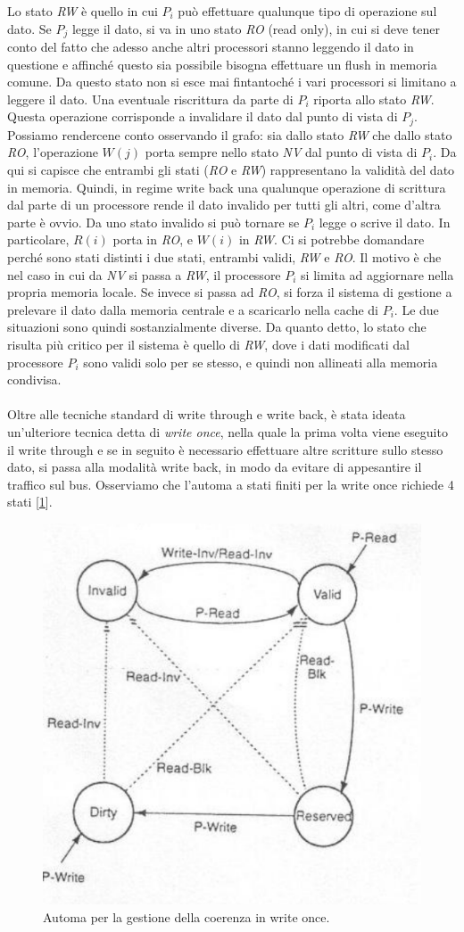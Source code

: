 Lo stato \textit{RW} è quello in cui \(P_i\)
può effettuare qualunque tipo di operazione sul dato. Se \(P_j\) legge il dato, si va in uno stato \textit{RO}
(read only), in cui si deve tener conto del fatto che adesso anche altri processori stanno leggendo il dato in
questione e affinché questo sia possibile bisogna effettuare un flush in memoria comune. Da questo stato non si esce mai fintantoché i vari processori si limitano a leggere il dato.
Una eventuale riscrittura da parte di \(P_i\) riporta allo stato \textit{RW}. Questa operazione corrisponde a
invalidare il dato dal punto di vista di \(P_j\). Possiamo rendercene conto osservando il grafo: sia dallo stato \textit{RW} che dallo stato \textit{RO}, l'operazione \(W(j)\) porta sempre nello stato
\textit{NV} dal punto di vista di \(P_i\). Da qui si capisce che entrambi gli stati (\textit{RO} e \textit{RW})
rappresentano la validità del dato in memoria. Quindi, in regime write back una qualunque operazione
di scrittura dal parte di un processore rende il dato invalido per tutti gli altri, come d'altra parte è ovvio. Da uno stato invalido si può tornare se \(P_i\) legge o scrive il dato. In particolare, \(R(i)\) porta in \textit{RO}, e \(W(i)\) in \textit{RW}. Ci si potrebbe domandare perché sono stati distinti i due stati, entrambi validi, \textit{RW} e \textit{RO}. Il motivo è che nel caso in cui da \textit{NV} si passa a \textit{RW}, il processore \(P_i\) si limita ad
aggiornare nella propria memoria locale. Se invece si passa ad \textit{RO}, si forza il sistema di
gestione a prelevare il dato dalla memoria centrale e a scaricarlo nella cache di \(P_i\). Le due situazioni sono quindi sostanzialmente diverse. Da quanto detto, lo stato che risulta più critico per il sistema è quello di \textit{RW}, dove i dati modificati dal processore \(P_i\) sono validi solo per se stesso, e quindi non allineati alla memoria condivisa.
\\
\\
Oltre alle tecniche standard di write through e write back, è stata ideata un’ulteriore tecnica detta di \textit{write once}, nella quale la prima volta viene eseguito il write through e se in seguito è necessario effettuare altre scritture sullo stesso dato, si passa alla modalità write back, in modo da
evitare di appesantire il traffico sul bus. Osserviamo che l’automa a stati finiti per la write once richiede 4 stati [\ref{fig:automa-wo}].
\begin{figure}[!h]
    \centering
    \includegraphics[width=0.5\linewidth]{img/automa-wo.png}
    \caption{Automa per la gestione della coerenza in write once.}
    \label{fig:automa-wo}
\end{figure}
